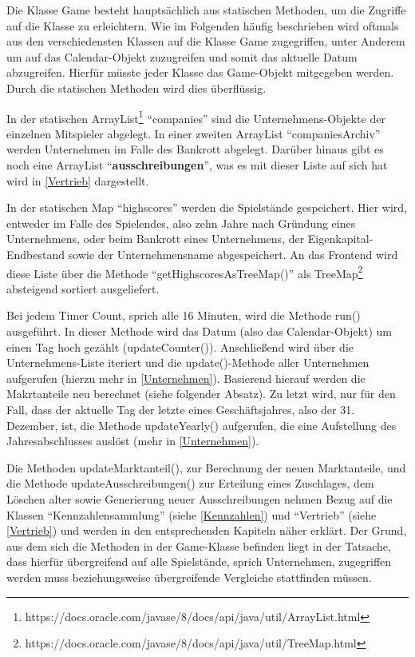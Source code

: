 Die Klasse Game besteht hauptsächlich aus statischen Methoden, um die Zugriffe auf die Klasse zu erleichtern. Wie im Folgenden häufig beschrieben wird oftmals aus den verschiedensten Klassen auf die Klasse Game zugegriffen, unter Anderem um auf das Calendar-Objekt zuzugreifen und somit das aktuelle Datum abzugreifen. Hierfür müsste jeder Klasse das Game-Objekt mitgegeben werden. Durch die statischen Methoden wird dies überflüssig.

In der statischen ArrayList\footnote{https://docs.oracle.com/javase/8/docs/api/java/util/ArrayList.html} \enquote{companies} sind die Unternehmens-Objekte der einzelnen Mitspieler abgelegt. In einer zweiten ArrayList \enquote{companiesArchiv} werden Unternehmen im Falle des Bankrott abgelegt. Darüber hinaus gibt es noch eine ArrayList \enquote{\textbf{ausschreibungen}}, was es mit dieser Liste auf sich hat wird in \ref{Vertrieb} dargestellt.

In der statischen Map \enquote{highscores} werden die Spielstände gespeichert. Hier wird, entweder im Falle des Spielendes, also zehn Jahre nach Gründung eines Unternehmens, oder beim Bankrott eines Unternehmens, der Eigenkapital-Endbestand sowie der Unternehmensname abgespeichert. An das Frontend wird diese Liste über die Methode \enquote{getHighscoresAsTreeMap()} als TreeMap\footnote{https://docs.oracle.com/javase/8/docs/api/java/util/TreeMap.html} absteigend sortiert ausgeliefert.

Bei jedem Timer Count, sprich alle 16 Minuten, wird die Methode run() ausgeführt. In dieser Methode wird das Datum (also das Calendar-Objekt) um einen Tag hoch gezählt (updateCounter()). Anschließend wird über die Unternehmens-Liste iteriert und die update()-Methode aller Unternehmen aufgerufen (hierzu mehr in \ref{Unternehmen}). Basierend hierauf werden die Makrtanteile neu berechnet (siehe folgender Absatz). Zu letzt wird, nur für den Fall, dass der aktuelle Tag der letzte eines Geschäftsjahres, also der 31. Dezember, ist, die Methode updateYearly() aufgerufen, die eine Aufstellung des Jahresabschlusses auslöst (mehr in \ref{Unternehmen}).

Die Methoden updateMarktanteil(), zur Berechnung der neuen Marktanteile, und die Methode updateAusschreibungen() zur Erteilung eines Zuschlages, dem Löschen alter sowie Generierung neuer Ausschreibungen nehmen Bezug auf die Klassen \enquote{Kennzahlensammlung} (siehe \ref{Kennzahlen}) und \enquote{Vertrieb} (siehe \ref{Vertrieb}) und werden in den entsprechenden Kapiteln näher erklärt. Der Grund, aus dem sich die Methoden in der Game-Klasse befinden liegt in der Tatsache, dass hierfür übergreifend auf alle Spielstände, sprich Unternehmen, zugegriffen werden muss beziehungsweise übergreifende Vergleiche stattfinden müssen.


